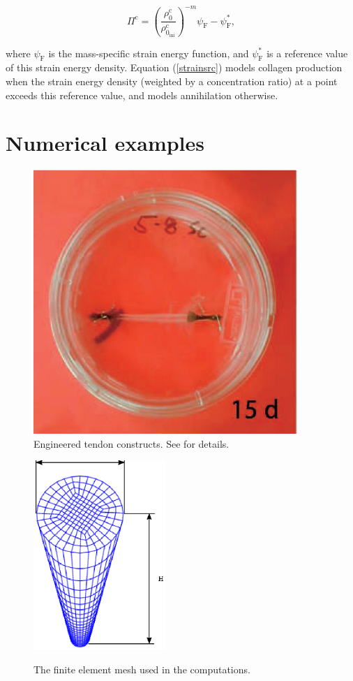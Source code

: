 \begin{equation}
\Pi^\mathrm{c} =
\left(\frac{\rho^\mathrm{c}_0}{\rho^\mathrm{c}_{0_\mathrm{ini}}}\right)^{-m}
\psi_{\mathrm{F}}-\psi_{\mathrm{F}}^*,
\label{strainsrc}
\end{equation}

\noindent where $\psi_{\mathrm{F}}$ is the mass-specific strain energy
function, and $\psi_{\mathrm{F}}^*$ is a reference value of this
strain energy density. Equation (\ref{strainsrc}) models collagen
production when the strain energy density (weighted by a concentration
ratio) at a point exceeds this reference value, and models 
annihilation otherwise.

\section{Numerical examples}
\label{numericalimplementation}

\begin{figure}
\centering
  \includegraphics[width=10.00cm]{images/one-construct.eps}
\caption{Engineered tendon constructs. See \citet{Calve:04} for
  details.} 
\label{engconst}
\end{figure}

\begin{figure}[ht]
  \centering
  {\includegraphics[width=5cm]{images/mesh.eps}}
  \caption{The finite element mesh used in the computations.}
  \label{egmesh}
\end{figure}

